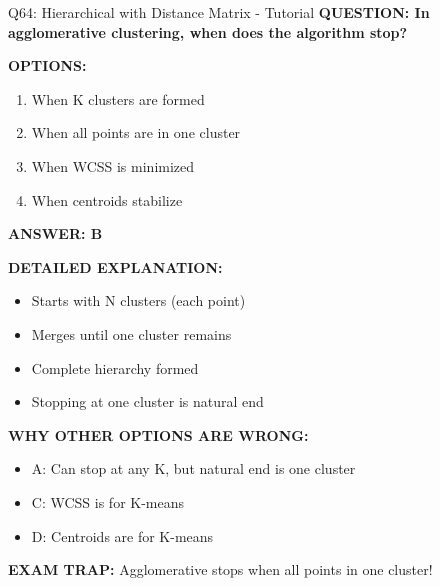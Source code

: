 \documentclass[8pt]{beamer}
\begin{document}
	\begin{frame}{Q64: Hierarchical with Distance Matrix - Tutorial}
		\fontsize{6.5}{7.5}\selectfont
		\textbf{QUESTION: In agglomerative clustering, when does the algorithm stop?}
		
		\vspace{0.1cm}
		\textbf{OPTIONS:}
		\begin{enumerate}
			\item When K clusters are formed
			\item When all points are in one cluster
			\item When WCSS is minimized
			\item When centroids stabilize
		\end{enumerate}
		
		\vspace{0.1cm}
		\textcolor{myblue}{\textbf{ANSWER: B}}
		
		\vspace{0.1cm}
		\textbf{DETAILED EXPLANATION:}
		\begin{itemize}
			\item Starts with N clusters (each point)
			\item Merges until one cluster remains
			\item Complete hierarchy formed
			\item Stopping at one cluster is natural end
		\end{itemize}
		
		\vspace{0.1cm}
		\textcolor{myred}{\textbf{WHY OTHER OPTIONS ARE WRONG:}}
		\begin{itemize}
			\item \textcolor{myred}{A:} Can stop at any K, but natural end is one cluster
			\item \textcolor{myred}{C:} WCSS is for K-means
			\item \textcolor{myred}{D:} Centroids are for K-means
		\end{itemize}
		
		\textcolor{myred}{\textbf{EXAM TRAP:}} Agglomerative stops when \textcolor{myblue}{all points in one cluster}!
	\end{frame}
	
\end{document}
